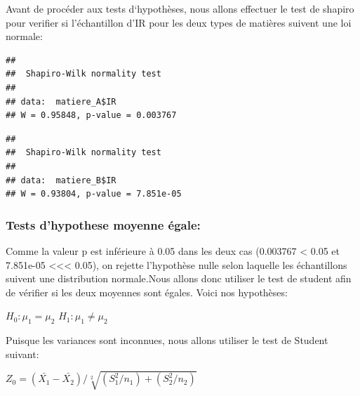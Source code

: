 \documentclass[
]{article}
\newenvironment{Shaded}{\begin{snugshade}}{\end{snugshade}}
\newcommand{\FunctionTok}[1]{\textcolor[rgb]{0.13,0.29,0.53}{\textbf{#1}}}
\newcommand{\NormalTok}[1]{#1}
\newcommand{\SpecialCharTok}[1]{\textcolor[rgb]{0.81,0.36,0.00}{\textbf{#1}}}
\begin{document}
Avant de procéder aux tests d`hypothèses, nous allons effectuer le test
de shapiro pour verifier si l'échantillon d'IR pour les deux types de
matières suivent une loi normale:

\begin{Shaded}
\end{Shaded}

\begin{verbatim}
## 
##  Shapiro-Wilk normality test
## 
## data:  matiere_A$IR
## W = 0.95848, p-value = 0.003767
\end{verbatim}

\begin{Shaded}
\end{Shaded}

\begin{verbatim}
## 
##  Shapiro-Wilk normality test
## 
## data:  matiere_B$IR
## W = 0.93804, p-value = 7.851e-05
\end{verbatim}

\hypertarget{tests-dhypothese-moyenne-uxe9gale}{%
\subsubsection{Tests d'hypothese moyenne
égale:}\label{tests-dhypothese-moyenne-uxe9gale}}

Comme la valeur p est inférieure à 0.05 dans les deux cas (0.003767
\textless{} 0.05 et 7.851e-05 \textless\textless\textless{} 0.05), on
rejette l'hypothèse nulle selon laquelle les échantillons suivent une
distribution normale.Nous allons donc utiliser le test de student afin
de vérifier si les deux moyennes sont égales. Voici nos hypothèses:

\(H_0: \mu_1 = \mu_2\) \(H_1: \mu_1 \neq \mu_2\)

Puisque les variances sont inconnues, nous allons utiliser le test de
Student suivant:

\(Z_0 = (\bar{X_1} - \bar{X_2}) / \sqrt[2]{(S_1^2/n_1)+(S_2^2/n_2)}\)
\end{document}
